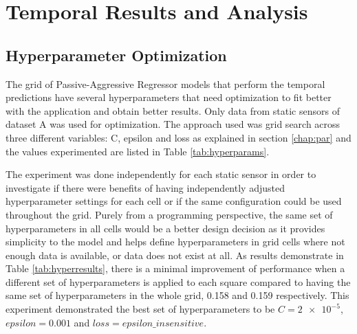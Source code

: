 \section{Temporal Results and Analysis}

\subsection{Hyperparameter Optimization}
The grid of Passive-Aggressive Regressor models that perform the temporal predictions have several hyperparameters that need optimization to fit better with the application and obtain better results. Only data from static sensors of dataset A was used for optimization. The approach used was grid search across three different variables: C, epsilon and loss as explained in section \ref{chap:par} and the values experimented are listed in Table \ref{tab:hyperparams}.

\begin{table}[H]
\centering
{}
\caption{List of hyperparameters used in grid search method}
\label{tab:hyperparams}
\end{table}

The experiment was done independently for each static sensor in order to investigate if there were benefits of having independently adjusted hyperparameter settings for each cell or if the same configuration could be used throughout the grid. Purely from a programming perspective, the same set of hyperparameters in all cells would be a better design decision as it provides simplicity to the model and helps define hyperparameters in grid cells where not enough data is available, or data does not exist at all. As results demonstrate in Table \ref{tab:hyperresults}, there is a minimal improvement of performance when a different set of hyperparameters is applied to each square compared to having the same set of hyperparameters in the whole grid, 0.158 and 0.159 respectively.
This experiment demonstrated the best set of hyperparameters to be $C= \num{2e-5}$, $epsilon = 0.001$ and $loss = epsilon\_insensitive$.

